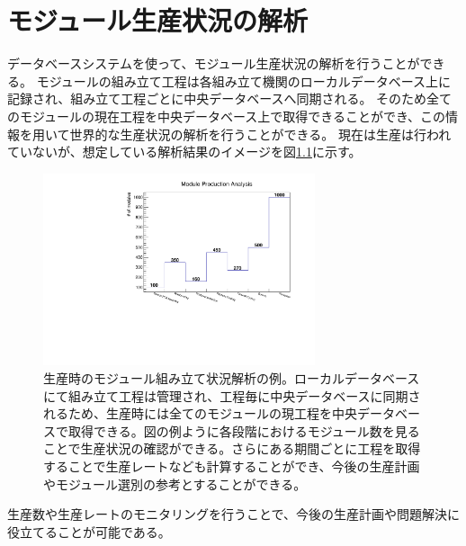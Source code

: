 \chapter{モジュール生産状況の解析}

データベースシステムを使って、モジュール生産状況の解析を行うことができる。
モジュールの組み立て工程は各組み立て機関のローカルデータベース上に記録され、組み立て工程ごとに中央データベースへ同期される。
そのため全てのモジュールの現在工程を中央データベース上で取得できることができ、この情報を用いて世界的な生産状況の解析を行うことができる。
現在は生産は行われていないが、想定している解析結果のイメージを図\ref{production_analysis}に示す。

\begin{figure}[bpt]\centering
\includegraphics[width=8cm,angle=270]{./production_analysis.pdf}
\caption[生産時のモジュール組み立て状況解析の例]{生産時のモジュール組み立て状況解析の例。ローカルデータベースにて組み立て工程は管理され、工程毎に中央データベースに同期されるため、生産時には全てのモジュールの現工程を中央データベースで取得できる。図の例ように各段階におけるモジュール数を見ることで生産状況の確認ができる。さらにある期間ごとに工程を取得することで生産レートなども計算することができ、今後の生産計画やモジュール選別の参考とすることができる。}
\label{production_analysis}
\end{figure}

生産数や生産レートのモニタリングを行うことで、今後の生産計画や問題解決に役立てることが可能である。

